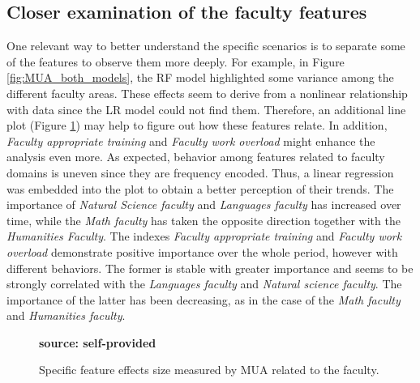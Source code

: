 \subsection{Closer examination of the faculty features}

One relevant way to better understand the specific scenarios is to separate some of the features to observe them more deeply. For example, in Figure \ref{fig:MUA_both_models}, the RF model highlighted some variance among the different faculty areas. These effects seem to derive from a nonlinear relationship with data since the LR model could not find them. Therefore, an additional line plot (Figure \ref{fig:set_variables}) may help to figure out how these features relate. In addition, \textit{Faculty appropriate training} and \textit{Faculty work overload} might enhance the analysis even more. 
As expected, behavior among features related to faculty domains is uneven since they are frequency encoded. Thus, a linear regression was embedded into the plot to obtain a better perception of their trends. The importance of \textit{Natural Science faculty} and \textit{Languages faculty} has increased over time, while the \textit{Math faculty} has taken the opposite direction together with the \textit{Humanities Faculty}. The indexes \textit{Faculty appropriate training} and \textit{Faculty work overload} demonstrate positive importance over the whole period, however with different behaviors. The former is stable with greater importance and seems to be strongly correlated with the \textit{Languages faculty} and \textit{Natural science faculty}. The importance of the latter has been decreasing, as in the case of the \textit{Math faculty} and \textit{Humanities faculty}.
\begin{figure}[ht!]
\centering
\caption{\textmd{ Specific feature effects size measured by MUA related to the faculty.}}
\label{fig:set_variables}
\par\medskip\ABNTEXfontereduzida\selectfont\textbf{source: self-provided}  
\par\medskip
\end{figure}



